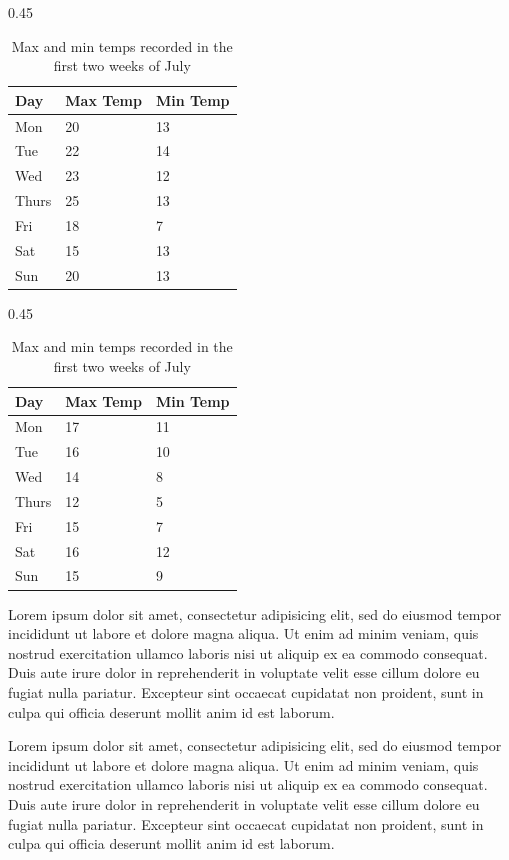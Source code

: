\begin{table}[h]
    \begin{subtable}[h]{0.45\textwidth}
        \centering
        \begin{tabular}{l | l | l}
        Day & Max Temp & Min Temp \\
        \hline \hline
        Mon & 20 & 13\\
        Tue & 22 & 14\\
        Wed & 23 & 12\\
        Thurs & 25 & 13\\
        Fri & 18 & 7\\
        Sat & 15 & 13\\
        Sun & 20 & 13
        \end{tabular}
        \caption{First Week}
        \label{tab:week1}
    \end{subtable}
    \hfill
    \begin{subtable}[h]{0.45\textwidth}
        \centering
        \begin{tabular}{l | l | l}
        Day & Max Temp & Min Temp \\
        \hline \hline
        Mon & 17 & 11\\
        Tue & 16 & 10\\
        Wed & 14 & 8\\
        Thurs & 12 & 5\\
        Fri & 15 & 7\\
        Sat & 16 & 12\\
        Sun & 15 & 9
        \end{tabular}
        \caption{Second Week}
        \label{tab:week2}
    \end{subtable}
    \caption{Max and min temps recorded in the first two weeks of July}
    \label{tab:temps}
\end{table}

Lorem ipsum dolor sit amet, consectetur adipisicing elit, sed do eiusmod tempor incididunt ut labore et dolore magna aliqua. Ut enim ad minim veniam, quis nostrud exercitation ullamco laboris nisi ut aliquip ex ea commodo consequat. Duis aute irure dolor in reprehenderit in voluptate velit esse cillum dolore eu fugiat nulla pariatur. Excepteur sint occaecat cupidatat non proident, sunt in culpa qui officia deserunt mollit anim id est laborum.

Lorem ipsum dolor sit amet, consectetur adipisicing elit, sed do eiusmod tempor incididunt ut labore et dolore magna aliqua. Ut enim ad minim veniam, quis nostrud exercitation ullamco laboris nisi ut aliquip ex ea commodo consequat. Duis aute irure dolor in reprehenderit in voluptate velit esse cillum dolore eu fugiat nulla pariatur. Excepteur sint occaecat cupidatat non proident, sunt in culpa qui officia deserunt mollit anim id est laborum.

